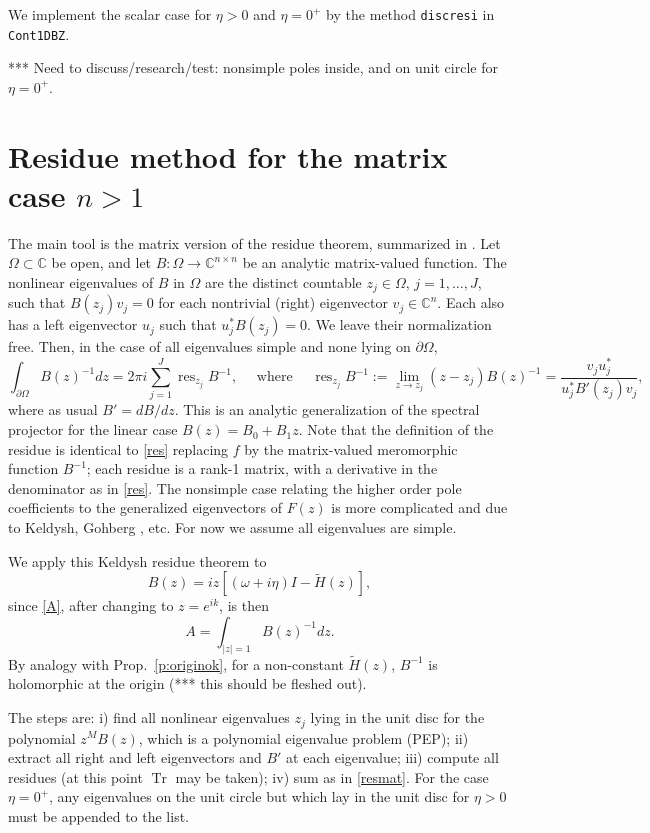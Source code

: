 \documentclass[11pt]{article}
\newcommand{\be}{\begin{equation}}
\newcommand{\ee}{\end{equation}}
\newcommand{\C}{\mathbb{C}}
\DeclareMathOperator{\tr}{Tr}
\DeclareMathOperator{\res}{res}
\newcommand{\om}{\omega}
\newcommand{\tH}{\tilde H}
\begin{document}
We implement the scalar case for $\eta>0$ and $\eta=0^+$
by the method \texttt{discresi} in \texttt{Cont1DBZ}.



*** Need to discuss/research/test: nonsimple poles inside, and on unit circle
for $\eta=0^+$.




\section{Residue method for the matrix case $n>1$}


The main tool is the matrix version of the residue theorem,
summarized in \cite[Thm.~2.9]{beyn12}.
Let $\Omega \subset \C$ be open, and let
$B: \Omega \to \C^{n\times n}$ be an analytic matrix-valued function.
The nonlinear eigenvalues of $B$ in $\Omega$ are the distinct
countable $z_j\in\Omega$, $j=1,\dots,J$, such that
$B(z_j)v_j = 0$ for each nontrivial (right) eigenvector $v_j\in\C^n$.
Each also has a left eigenvector $u_j$ such that $u_j^*B(z_j) = 0$.
We leave their normalization free.
Then, in the case of all eigenvalues simple and none lying on $\partial\Omega$,
\be
\int_{\partial\Omega} B(z)^{-1} dz =
2\pi i \sum_{j=1}^J \res_{z_j} B^{-1},
\quad \mbox{ where }
\quad
\res_{z_j} B^{-1} := \lim_{z\to z_j} (z-z_j)B(z)^{-1}
= \frac{v_j u_j^*}{u_j^* B'(z_j) v_j},
\label{resmat}
\ee
where as usual $B'=dB/dz$.
This is an analytic generalization of the spectral projector for the linear
case $B(z) = B_0 + B_1z$.
Note that the definition of the residue is identical
to \eqref{res} replacing $f$ by the matrix-valued meromorphic
function $B^{-1}$; each residue is a rank-1 matrix,
with a derivative in the denominator as in \eqref{res}.
The nonsimple case relating the higher order pole
coefficients to the generalized eigenvectors of $F(z)$
is more complicated and due to Keldysh, Gohberg \cite{gohberg}, etc.
For now we assume all eigenvalues are simple.

We apply this Keldysh residue theorem to
$$
B(z) = iz[(\om+i\eta)I - \tH(z)],
$$
since \eqref{A}, after changing to $z=e^{ik}$, is then
$$
A = \int_{|z|=1} B(z)^{-1} dz.
$$
By analogy with Prop.~\ref{p:originok}, for a non-constant $\tH(z)$, $B^{-1}$
is holomorphic at the origin (*** this should be fleshed out).

The steps are:
i) find all nonlinear eigenvalues $z_j$ lying in the unit disc
for the polynomial $z^MB(z)$,
which is a polynomial eigenvalue problem (PEP);
ii) extract all right and left eigenvectors and $B'$ at each eigenvalue;
iii) compute all residues (at this point $\tr$ may be taken);
iv) sum as in \eqref{resmat}.
For the case $\eta=0^+$, any eigenvalues on the unit circle
but which lay in the unit disc for $\eta>0$ must be appended to the list.
\end{document}

